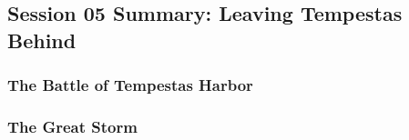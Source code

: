 \subsection{Session 05 Summary: Leaving Tempestas Behind}

\subsubsection{The Battle of Tempestas Harbor}

\subsubsection{The Great Storm}